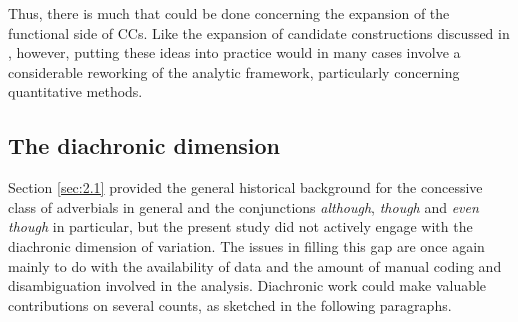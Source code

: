 Thus, there is much that could be done concerning the expansion of the functional side of CCs. Like the expansion of candidate constructions discussed in , however, putting these ideas into practice would in many cases involve a considerable reworking of the analytic framework, particularly concerning quantitative methods.

\subsection{The diachronic dimension}\label{sec:12.2.3}\largerpage

Section \ref{sec:2.1} provided the general historical background for the concessive class of adverbials in general and the conjunctions \textit{although}, \textit{though} and \textit{even though} in particular, but the present study did not actively engage with the diachronic dimension of variation. The issues in filling this gap are once again mainly to do with the availability of data and the amount of manual coding and disambiguation involved in the analysis. Diachronic work could make valuable contributions on several counts, as sketched in the following paragraphs.

